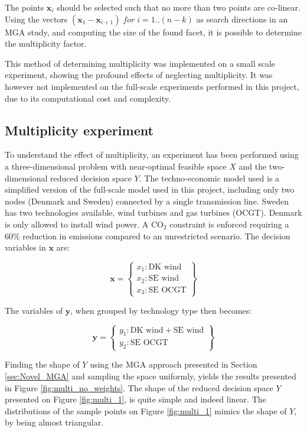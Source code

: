 The points $\mathbf{x}_i$ should be selected such that no more than two points are co-linear. Using the vectors  $(\mathbf{x}_1-\mathbf{x}_{i+1}) \; for \; i=1..(n-k)$ as search directions in an MGA study, and computing the size of the found facet, it is possible to determine the multiplicity factor. 

This method of determining multiplicity was implemented on a small scale experiment, showing the profound effects of neglecting multiplicity. It was however not implemented on the full-scale experiments performed in this project, due to its computational cost and complexity.  


\subsection{Multiplicity experiment}

To understand the effect of multiplicity, an experiment has been performed using a three-dimensional problem with near-optimal feasible space $X$ and the two-dimensional reduced decision space $Y$. The techno-economic model used is a simplified version of the full-scale model used in this project, including only two nodes (Denmark and Sweden) connected by a single transmission line. Sweden has two technologies available, wind turbines and gas turbines (OCGT). Denmark is only allowed to install wind power. A $\text{CO}_2$ constraint is enforced requiring a 60\% reduction in emissions compared to an unrestricted scenario.  The decision variables in $\mathbf{x}$ are:

\begin{equation}
\mathbf{x} = 
\begin{Bmatrix}
x_1: \text{DK wind} \\
x_2: \text{SE wind} \\
x_3: \text{SE OCGT}
\end{Bmatrix}
\end{equation}

The variables of $\mathbf{y}$, when grouped by technology type then becomes: 

\begin{equation}
\mathbf{y} = 
\begin{Bmatrix}
y_1: \text{DK wind} + \text{SE wind} \\
y_2: \text{SE OCGT}
\end{Bmatrix}
\end{equation}

Finding the shape of $Y$ using the MGA approach presented in Section  \ref{sec:Novel_MGA} and sampling the space uniformly, yields the results presented in Figure \ref{fig:multi_no_weights}. The shape of the reduced decision space $Y$ presented on Figure \ref{fig:multi_1}, is quite simple and indeed linear. The distributions of the sample points on Figure \ref{fig:multi_1} mimics the shape of $Y$, by being almost triangular. 


